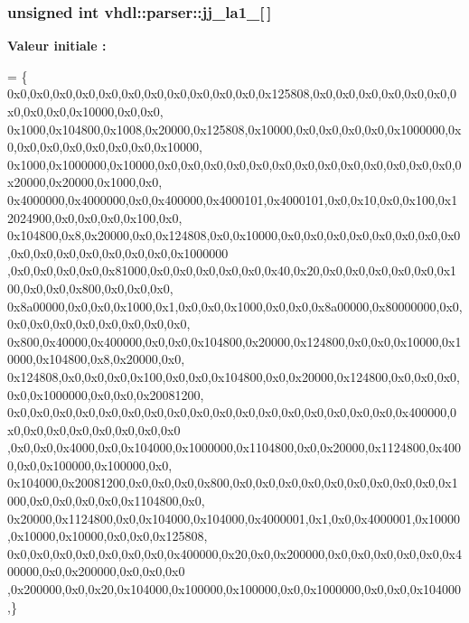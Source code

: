 \subsubsection[{jj\+\_\+la1\+\_\+1}]{\setlength{\rightskip}{0pt plus 5cm}unsigned int vhdl\+::parser\+::jj\+\_\+la1\+\_\mbox{[}$\,$\mbox{]}}\label{namespacevhdl_1_1parser_a49f05db6f0680c2723cb125a109a48fa}
{\bfseries Valeur initiale \+:}
\begin{DoxyCode}
= \{
0x0,0x0,0x0,0x0,0x0,0x0,0x0,0x0,0x0,0x0,0x0,0x125808,0x0,0x0,0x0,0x0,0x0,0x0,0x0,0x0,0x0,0x10000,0x0,0x0,
      0x1000,0x104800,0x1008,0x20000,0x125808,0x10000,0x0,0x0,0x0,0x0,0x1000000,0x0,0x0,0x0,0x0,0x0,0x0,0x0,0x10000,
      0x1000,0x1000000,0x10000,0x0,0x0,0x0,0x0,0x0,0x0,0x0,0x0,0x0,0x0,0x0,0x0,0x0,0x20000,0x20000,0x1000,0x0,
      0x4000000,0x4000000,0x0,0x400000,0x4000101,0x4000101,0x0,0x10,0x0,0x100,0x12024900,0x0,0x0,0x0,0x100,0x0,
      0x104800,0x8,0x20000,0x0,0x124808,0x0,0x10000,0x0,0x0,0x0,0x0,0x0,0x0,0x0,0x0,0x0,0x0,0x0,0x0,0x0,0x0,0x0,0x1000000
      ,0x0,0x0,0x0,0x0,0x81000,0x0,0x0,0x0,0x0,0x0,0x40,0x20,0x0,0x0,0x0,0x0,0x0,0x100,0x0,0x0,0x800,0x0,0x0,0x0,
      0x8a00000,0x0,0x0,0x1000,0x1,0x0,0x0,0x1000,0x0,0x0,0x8a00000,0x80000000,0x0,0x0,0x0,0x0,0x0,0x0,0x0,0x0,0x0,
      0x800,0x40000,0x400000,0x0,0x0,0x104800,0x20000,0x124800,0x0,0x0,0x10000,0x10000,0x104800,0x8,0x20000,0x0,
      0x124808,0x0,0x0,0x0,0x100,0x0,0x0,0x104800,0x0,0x20000,0x124800,0x0,0x0,0x0,0x0,0x1000000,0x0,0x0,0x20081200,
      0x0,0x0,0x0,0x0,0x0,0x0,0x0,0x0,0x0,0x0,0x0,0x0,0x0,0x0,0x0,0x0,0x0,0x400000,0x0,0x0,0x0,0x0,0x0,0x0,0x0,0x0
      ,0x0,0x0,0x4000,0x0,0x104000,0x1000000,0x1104800,0x0,0x20000,0x1124800,0x4000,0x0,0x100000,0x100000,0x0,
      0x104000,0x20081200,0x0,0x0,0x0,0x800,0x0,0x0,0x0,0x0,0x0,0x0,0x0,0x0,0x0,0x1000,0x0,0x0,0x0,0x0,0x1104800,0x0,
      0x20000,0x1124800,0x0,0x104000,0x104000,0x4000001,0x1,0x0,0x4000001,0x10000,0x10000,0x10000,0x0,0x0,0x125808,
      0x0,0x0,0x0,0x0,0x0,0x0,0x0,0x400000,0x20,0x0,0x200000,0x0,0x0,0x0,0x0,0x0,0x400000,0x0,0x200000,0x0,0x0,0x0
      ,0x200000,0x0,0x20,0x104000,0x100000,0x100000,0x0,0x1000000,0x0,0x0,0x104000,\}
\end{DoxyCode}
\hypertarget{namespacevhdl_1_1parser_a2ce8ed90b801cc69d059b4f3732c8da3}{}
